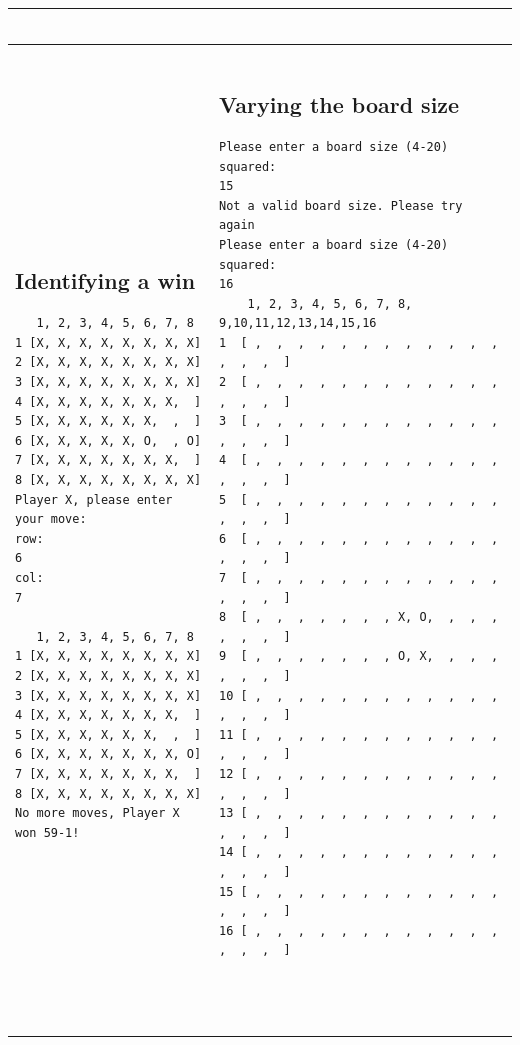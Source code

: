 \documentclass[a4wide, 11pt]{article}
\begin{document}
\begin{center}
\begin{tabular}{ | l | l |}
\begin{minipage}{85mm}
\begin{scriptsize}
\begin{verbatim}
          \end{verbatim}
        \end{scriptsize}
      \end{minipage}
      \\
      \hline
      \begin{minipage}{85mm}
      \tiny{\begin{verbatim} \end{verbatim}}
      \subsection{Identifying a win}
        \begin{scriptsize}
          \begin{verbatim}
   1, 2, 3, 4, 5, 6, 7, 8 
1 [X, X, X, X, X, X, X, X]
2 [X, X, X, X, X, X, X, X]
3 [X, X, X, X, X, X, X, X]
4 [X, X, X, X, X, X, X,  ]
5 [X, X, X, X, X, X,  ,  ]
6 [X, X, X, X, X, O,  , O]
7 [X, X, X, X, X, X, X,  ]
8 [X, X, X, X, X, X, X, X]
Player X, please enter your move:
row: 
6
col: 
7

   1, 2, 3, 4, 5, 6, 7, 8 
1 [X, X, X, X, X, X, X, X]
2 [X, X, X, X, X, X, X, X]
3 [X, X, X, X, X, X, X, X]
4 [X, X, X, X, X, X, X,  ]
5 [X, X, X, X, X, X,  ,  ]
6 [X, X, X, X, X, X, X, O]
7 [X, X, X, X, X, X, X,  ]
8 [X, X, X, X, X, X, X, X]
No more moves, Player X won 59-1!
          \end{verbatim}
        \end{scriptsize}
      \end{minipage}
      &
      \begin{minipage}{85mm}
      \tiny{\begin{verbatim} \end{verbatim}}
      \subsection{Varying the board size}
        \begin{scriptsize}
          \begin{verbatim}
Please enter a board size (4-20) squared:
15
Not a valid board size. Please try again
Please enter a board size (4-20) squared:
16      
    1, 2, 3, 4, 5, 6, 7, 8, 9,10,11,12,13,14,15,16 
1  [ ,  ,  ,  ,  ,  ,  ,  ,  ,  ,  ,  ,  ,  ,  ,  ]
2  [ ,  ,  ,  ,  ,  ,  ,  ,  ,  ,  ,  ,  ,  ,  ,  ]
3  [ ,  ,  ,  ,  ,  ,  ,  ,  ,  ,  ,  ,  ,  ,  ,  ]
4  [ ,  ,  ,  ,  ,  ,  ,  ,  ,  ,  ,  ,  ,  ,  ,  ]
5  [ ,  ,  ,  ,  ,  ,  ,  ,  ,  ,  ,  ,  ,  ,  ,  ]
6  [ ,  ,  ,  ,  ,  ,  ,  ,  ,  ,  ,  ,  ,  ,  ,  ]
7  [ ,  ,  ,  ,  ,  ,  ,  ,  ,  ,  ,  ,  ,  ,  ,  ]
8  [ ,  ,  ,  ,  ,  ,  , X, O,  ,  ,  ,  ,  ,  ,  ]
9  [ ,  ,  ,  ,  ,  ,  , O, X,  ,  ,  ,  ,  ,  ,  ]
10 [ ,  ,  ,  ,  ,  ,  ,  ,  ,  ,  ,  ,  ,  ,  ,  ]
11 [ ,  ,  ,  ,  ,  ,  ,  ,  ,  ,  ,  ,  ,  ,  ,  ]
12 [ ,  ,  ,  ,  ,  ,  ,  ,  ,  ,  ,  ,  ,  ,  ,  ]
13 [ ,  ,  ,  ,  ,  ,  ,  ,  ,  ,  ,  ,  ,  ,  ,  ]
14 [ ,  ,  ,  ,  ,  ,  ,  ,  ,  ,  ,  ,  ,  ,  ,  ]
15 [ ,  ,  ,  ,  ,  ,  ,  ,  ,  ,  ,  ,  ,  ,  ,  ]
16 [ ,  ,  ,  ,  ,  ,  ,  ,  ,  ,  ,  ,  ,  ,  ,  ]




\end{verbatim}
\end{scriptsize}
\end{minipage}
\end{tabular}
\end{center}
\end{document}
